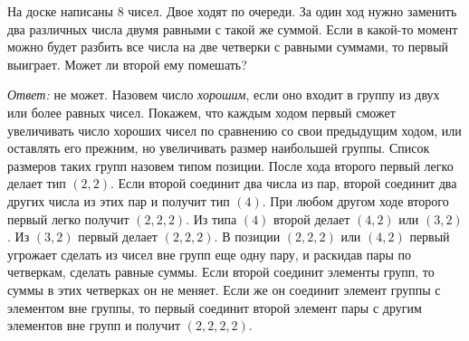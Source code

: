 На доске написаны $8$ чисел.
Двое ходят по очереди.
За один ход нужно заменить два различных числа двумя равными с такой же суммой.
Если в какой-то момент можно будет разбить все числа на две четверки с равными
суммами, то первый выиграет.
Может ли второй ему помешать?

\solution
\emph{Ответ:} не может.
Назовем число \emph{хорошим}, если оно входит в группу из двух или более равных
чисел.
Покажем, что каждым ходом первый сможет увеличивать число хороших чисел по
сравнению со свои предыдущим ходом, или оставлять его прежним, но увеличивать
размер наибольшей группы.
Список размеров таких групп назовем типом позиции.
После хода второго первый легко делает тип $(2, 2)$.
Если второй соединит два числа из пар, второй соединит два других числа из этих
пар и получит тип $(4)$.
При любом другом ходе второго первый легко получит $(2, 2, 2)$.
Из типа $(4)$ второй делает $(4, 2)$ или $(3, 2)$.
Из $(3, 2)$ первый делает $(2, 2, 2)$.
В позиции $(2, 2, 2)$ или $(4, 2)$ первый угрожает сделать из чисел вне групп
еще одну пару, и раскидав пары по четверкам, сделать равные суммы.
Если второй соединит элементы групп, то суммы в этих четверках он не меняет.
Если же он соединит элемент группы с элементом вне группы, то первый соединит
второй элемент пары с другим элементов вне групп и получит $(2, 2, 2, 2)$.

